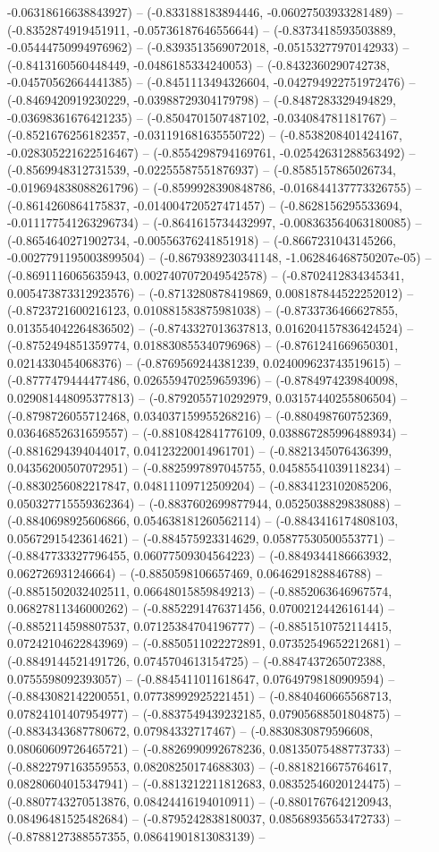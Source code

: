 -0.06318616638843927) -- (-0.833188183894446, -0.06027503933281489) -- (-0.8352874919451911, -0.05736187646556644) -- (-0.8373418593503889, -0.05444750994976962) -- (-0.8393513569072018, -0.05153277970142933) -- (-0.8413160560448449, -0.0486185334240053) -- (-0.8432360290742738, -0.04570562664441385) -- (-0.8451113494326604, -0.042794922751972476) -- (-0.8469420919230229, -0.03988729304179798) -- (-0.8487283329494829, -0.03698361676421235) -- (-0.8504701507487102, -0.034084781181767) -- (-0.8521676256182357, -0.031191681635550722) -- (-0.8538208401424167, -0.028305221622516467) -- (-0.8554298794169761, -0.02542631288563492) -- (-0.8569948312731539, -0.02255587551876937) -- (-0.8585157865026734, -0.019694838088261796) -- (-0.8599928390848786, -0.016844137773326755) -- (-0.8614260864175837, -0.014004720527471457) -- (-0.8628156295533694, -0.011177541263296734) -- (-0.8641615734432997, -0.008363564063180085) -- (-0.8654640271902734, -0.00556376241851918) -- (-0.8667231043145266, -0.0027791195003899504) -- (-0.8679389230341148, -1.062846468750207e-05) -- (-0.8691116065635943, 0.0027407072049542578) -- (-0.8702412834345341, 0.005473873312923576) -- (-0.8713280878419869, 0.008187844522252012) -- (-0.8723721600216123, 0.010881583875981038) -- (-0.8733736466627855, 0.013554042264836502) -- (-0.8743327013637813, 0.016204157836424524) -- (-0.8752494851359774, 0.018830855340796968) -- (-0.8761241669650301, 0.0214330454068376) -- (-0.8769569244381239, 0.024009623743519615) -- (-0.8777479444477486, 0.026559470259659396) -- (-0.8784974239840098, 0.029081448095377813) -- (-0.8792055710292979, 0.03157440255806504) -- (-0.8798726055712468, 0.034037159955268216) -- (-0.880498760752369, 0.03646852631659557) -- (-0.8810842841776109, 0.038867285996488934) -- (-0.8816294394044017, 0.04123220014961701) -- (-0.8821345076436399, 0.04356200507072951) -- (-0.8825997897045755, 0.04585541039118234) -- (-0.8830256082217847, 0.04811109712509204) -- (-0.8834123102085206, 0.050327715559362364) -- (-0.8837602699877944, 0.0525038829838088) -- (-0.8840698925606866, 0.054638181260562114) -- (-0.8843416174808103, 0.05672915423614621) -- (-0.884575923314629, 0.05877530500553771) -- (-0.8847733327796455, 0.06077509304564223) -- (-0.8849344186663932, 0.062726931246664) -- (-0.8850598106657469, 0.0646291828846788) -- (-0.8851502032402511, 0.06648015859849213) -- (-0.8852063646967574, 0.06827811346000262) -- (-0.8852291476371456, 0.0700212442616144) -- (-0.8852114598807537, 0.07125384704196777) -- (-0.8851510752114415, 0.07242104622843969) -- (-0.8850511022272891, 0.07352549652212681) -- (-0.8849144521491726, 0.0745704613154725) -- (-0.8847437265072388, 0.0755598092393057) -- (-0.8845411011618647, 0.07649798180909594) -- (-0.8843082142200551, 0.07738992925221451) -- (-0.8840460665568713, 0.07824101407954977) -- (-0.8837549439232185, 0.07905688501804875) -- (-0.8834343687780672, 0.07984332717467) -- (-0.8830830879596608, 0.08060609726465721) -- (-0.8826990992678236, 0.08135075488773733) -- (-0.8822797163559553, 0.08208250174688303) -- (-0.8818216675764617, 0.08280604015347941) -- (-0.8813212211812683, 0.08352546020124475) -- (-0.8807743270513876, 0.08424416194010911) -- (-0.8801767642120943, 0.08496481525482684) -- (-0.8795242838180037, 0.08568935653472733) -- (-0.8788127388557355, 0.08641901813083139) -- 